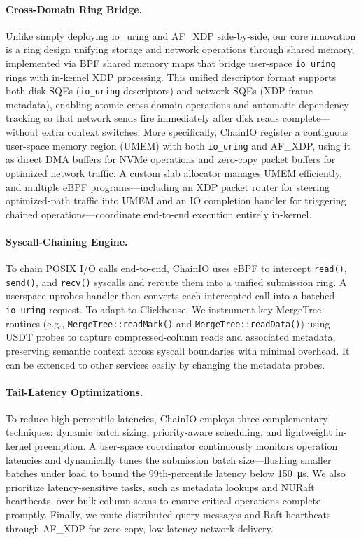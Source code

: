 \documentclass[sigconf,10pt]{acmart}
\newcommand{\sys}{ChainIO\xspace}
\begin{document}
\paragraph{Cross-Domain Ring Bridge.} Unlike simply deploying io_uring and AF_XDP side-by-side, our core innovation is a ring design unifying storage and network operations through shared memory, implemented via BPF shared memory maps that bridge user-space \texttt{io\_uring} rings with in-kernel XDP processing. This unified descriptor format supports both disk SQEs (\texttt{io\_uring} descriptors) and network SQEs (XDP frame metadata), enabling atomic cross-domain operations and automatic dependency tracking so that network sends fire immediately after disk reads complete—without extra context switches. More specifically, \sys register a contiguous user-space memory region (UMEM) with both \texttt{io\_uring} and AF\_XDP, using it as direct DMA buffers for NVMe operations and zero-copy packet buffers for optimized network traffic. A custom slab allocator manages UMEM efficiently, and multiple eBPF programs—including an XDP packet router for steering optimized-path traffic into UMEM and an IO completion handler for triggering chained operations—coordinate end-to-end execution entirely in-kernel.


\paragraph{Syscall-Chaining Engine.} To chain POSIX I/O calls end-to-end, \sys uses eBPF to intercept \texttt{read()}, \texttt{send()}, and \texttt{recv()} syscalls and reroute them into a unified submission ring. A userspace uprobes\cite{zheng2023bpftime} handler then converts each intercepted call into a batched \texttt{io\_uring} request. To adapt to Clickhouse, We instrument key MergeTree routines (e.g., \texttt{MergeTree::readMark()} and \texttt{MergeTree::readData()}) using USDT probes to capture compressed-column reads and associated metadata, preserving semantic context across syscall boundaries with minimal overhead. It can be extended to other services  easily by changing the metadata probes.

\paragraph{Tail-Latency Optimizations.} To reduce high-percentile latencies, \sys employs three complementary techniques: dynamic batch sizing, priority-aware scheduling, and lightweight in-kernel preemption. A user-space coordinator continuously monitors operation latencies and dynamically tunes the submission batch size—flushing smaller batches under load to bound the 99th-percentile latency below \SI{150}{\micro\second}. We also prioritize latency-sensitive tasks, such as metadata lookups and NURaft heartbeats, over bulk column scans to ensure critical operations complete promptly. Finally, we route distributed query messages and Raft heartbeats through AF\_XDP for zero-copy, low-latency network delivery.
\end{document}
